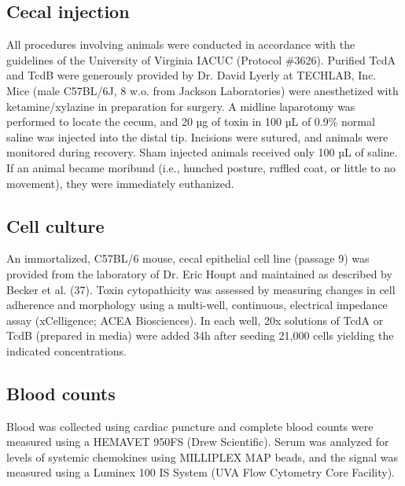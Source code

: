 \subsection{ Cecal injection }
All procedures involving animals were conducted in accordance with the guidelines of the University of Virginia IACUC (Protocol \#3626). Purified TcdA and TcdB were generously provided by Dr. David Lyerly at TECHLAB, Inc. Mice (male C57BL/6J, 8 w.o. from Jackson Laboratories) were anesthetized with ketamine/xylazine in preparation for surgery. A midline laparotomy was performed to locate the cecum, and 20 µg of toxin in 100 µL of 0.9\% normal saline was injected into the distal tip. Incisions were sutured, and animals were monitored during recovery. Sham injected animals received only 100 µL of saline. If an animal became moribund (i.e., hunched posture, ruffled coat, or little to no movement), they were immediately euthanized. 

\subsection{ Cell culture }
An immortalized, C57BL/6 mouse, cecal epithelial cell line (passage 9) was provided from the laboratory of Dr. Eric Houpt and maintained as described by Becker et al. (37). Toxin cytopathicity was assessed by measuring changes in cell adherence and morphology using a multi-well, continuous, electrical impedance assay (xCelligence; ACEA Biosciences). In each well, 20x solutions of TcdA or TcdB (prepared in media) were added 34h after seeding 21,000 cells yielding the indicated concentrations.

\subsection{ Blood counts }
Blood was collected using cardiac puncture and complete blood counts were measured using a HEMAVET 950FS (Drew Scientific). Serum was analyzed for levels of systemic chemokines using MILLIPLEX MAP beads, and the signal was measured using a Luminex 100 IS System (UVA Flow Cytometry Core Facility).

